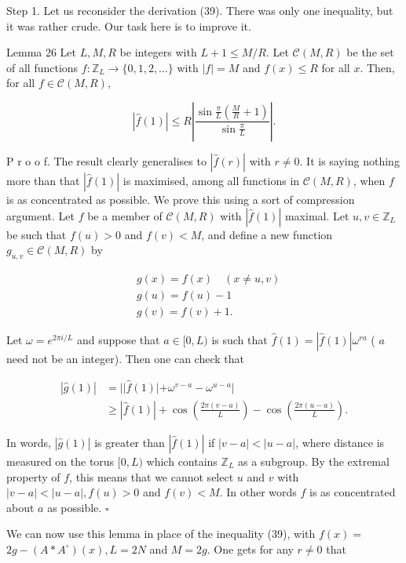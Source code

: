 \documentclass[10pt]{article}
\begin{document}
Step 1. Let us reconsider the derivation (39). There was only one inequality, but it was rather crude. Our task here is to improve it.

Lemma 26 Let $L, M, R$ be integers with $L+1 \leq M / R$. Let $\mathcal{C}(M, R)$ be the set of all functions $f: \mathbb{Z}_{L} \rightarrow\{0,1,2, \ldots\}$ with $|f|=M$ and $f(x) \leq R$ for all $x$. Then, for all $f \in \mathcal{C}(M, R)$,

$$
|\hat{f}(1)| \leq R\left|\frac{\sin \frac{\pi}{L}\left(\frac{M}{R}+1\right)}{\sin \frac{\pi}{L}}\right| .
$$

P r o o f. The result clearly generalises to $|\hat{f}(r)|$ with $r \neq 0$. It is saying nothing more than that $|\hat{f}(1)|$ is maximised, among all functions in $\mathcal{C}(M, R)$, when $f$ is as concentrated as possible. We prove this using a sort of compression argument. Let $f$ be a member of $\mathcal{C}(M, R)$ with $|\hat{f}(1)|$ maximal. Let $u, v \in \mathbb{Z}_{L}$ be such that $f(u)>0$ and $f(v)<M$, and define a new function $g_{u, v} \in \mathcal{C}(M, R)$ by

$$
\begin{aligned}
& g(x)=f(x) \quad(x \neq u, v) \\
& g(u)=f(u)-1 \\
& g(v)=f(v)+1 .
\end{aligned}
$$

Let $\omega=e^{2 \pi i / L}$ and suppose that $a \in[0, L)$ is such that $\hat{f}(1)=|\hat{f}(1)| \omega^{r a}$ ( $a$ need not be an integer). Then one can check that

$$
\begin{aligned}
|\hat{g}(1)| & =| | \hat{f}(1)\left|+\omega^{v-a}-\omega^{u-a}\right| \\
& \geq|\hat{f}(1)|+\cos \left(\frac{2 \pi(v-a)}{L}\right)-\cos \left(\frac{2 \pi(u-a)}{L}\right) .
\end{aligned}
$$

In words, $|\hat{g}(1)|$ is greater than $|\hat{f}(1)|$ if $|v-a|<|u-a|$, where distance is measured on the torus $[0, L)$ which contains $\mathbb{Z}_{L}$ as a subgroup. By the extremal property of $f$, this means that we cannot select $u$ and $v$ with $|v-a|<|u-a|, f(u)>0$ and $f(v)<M$. In other words $f$ is as concentrated about $a$ as possible. \(\square\)

We can now use this lemma in place of the inequality (39), with $f(x)=$ $2 g-\left(A * A^{\circ}\right)(x), L=2 N$ and $M=2 g$. One gets for any $r \neq 0$ that
\end{document}
